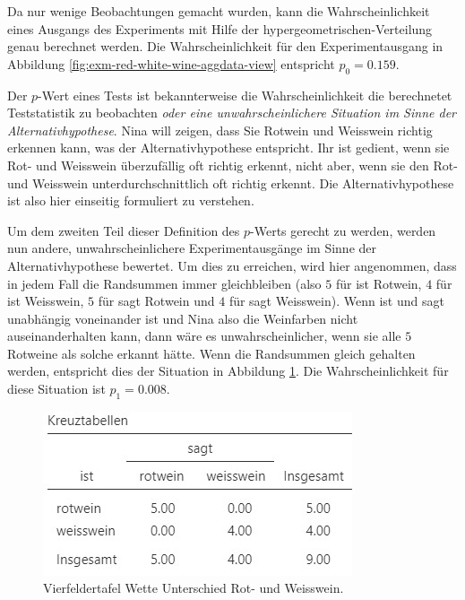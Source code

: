 \documentclass[
]{book}
\theoremstyle{definition}
\theoremstyle{definition}
\theoremstyle{definition}
\theoremstyle{definition}
\theoremstyle{remark}
\begin{document}
Da nur wenige Beobachtungen gemacht wurden, kann die Wahrscheinlichkeit
eines Ausgangs des Experiments mit Hilfe der
hypergeometrischen-Verteilung genau berechnet werden. Die
Wahrscheinlichkeit für den Experimentausgang in Abbildung
\ref{fig:exm-red-white-wine-aggdata-view} entspricht \(p_0 = 0.159\).

Der \(p\)-Wert eines Tests ist bekannterweise die Wahrscheinlichkeit die
berechnetet Teststatistik zu beobachten \emph{oder eine unwahrscheinlichere
Situation im Sinne der Alternativhypothese}. Nina will zeigen, dass Sie
Rotwein und Weisswein richtig erkennen kann, was der Alternativhypothese
entspricht. Ihr ist gedient, wenn sie Rot- und Weisswein überzufällig
oft richtig erkennt, nicht aber, wenn sie den Rot- und Weisswein
unterdurchschnittlich oft richtig erkennt. Die Alternativhypothese ist
also hier einseitig formuliert zu verstehen.

Um dem zweiten Teil dieser Definition des \(p\)-Werts gerecht zu werden,
werden nun andere, unwahrscheinlichere Experimentausgänge im Sinne der
Alternativhypothese bewertet. Um dies zu erreichen, wird hier
angenommen, dass in jedem Fall die Randsummen immer gleichbleiben (also
\(5\) für ist Rotwein, \(4\) für ist Weisswein, \(5\) für sagt Rotwein und \(4\)
für sagt Weisswein). Wenn ist und sagt unabhängig voneinander ist und
Nina also die Weinfarben nicht auseinanderhalten kann, dann wäre es
unwahrscheinlicher, wenn sie alle \(5\) Rotweine als solche erkannt hätte.
Wenn die Randsummen gleich gehalten werden, entspricht dies der
Situation in Abbildung \ref{fig:exm-red-white-wine-aggdata-view-alt}.
Die Wahrscheinlichkeit für diese Situation ist \(p_1 = 0.008\).

\begin{figure}

{\centering \includegraphics{figures/09-exm-red-white-wine-aggdata-view-alt} 

}

\caption{Vierfeldertafel Wette Unterschied Rot- und Weisswein.}\label{fig:exm-red-white-wine-aggdata-view-alt}
\end{figure}
\end{document}
